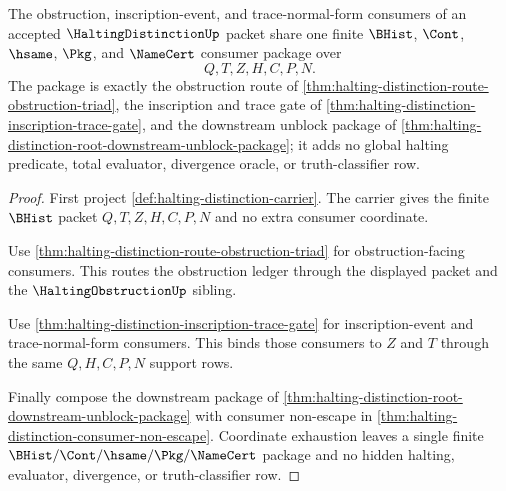 \begin{theorem}
\label{thm:halting-distinction-consumer-boundary-package}
The obstruction, inscription-event, and trace-normal-form consumers of an accepted $\HaltingDistinctionUp$ packet share one finite $\BHist$, $\Cont$, $\hsame$, $\Pkg$, and $\NameCert$ consumer package over
$$
Q,T,Z,H,C,P,N.
$$
The package is exactly the obstruction route of \autoref{thm:halting-distinction-route-obstruction-triad}, the inscription and trace gate of \autoref{thm:halting-distinction-inscription-trace-gate}, and the downstream unblock package of \autoref{thm:halting-distinction-root-downstream-unblock-package}; it adds no global halting predicate, total evaluator, divergence oracle, or truth-classifier row.
\end{theorem}
\begin{proof}
First project \autoref{def:halting-distinction-carrier}. The carrier gives the finite $\BHist$ packet $Q,T,Z,H,C,P,N$ and no extra consumer coordinate.

Use \autoref{thm:halting-distinction-route-obstruction-triad} for obstruction-facing consumers. This routes the obstruction ledger through the displayed packet and the $\HaltingObstructionUp$ sibling.

Use \autoref{thm:halting-distinction-inscription-trace-gate} for inscription-event and trace-normal-form consumers. This binds those consumers to $Z$ and $T$ through the same $Q,H,C,P,N$ support rows.

Finally compose the downstream package of \autoref{thm:halting-distinction-root-downstream-unblock-package} with consumer non-escape in \autoref{thm:halting-distinction-consumer-non-escape}. Coordinate exhaustion leaves a single finite $\BHist/\Cont/\hsame/\Pkg/\NameCert$ package and no hidden halting, evaluator, divergence, or truth-classifier row.
\end{proof}
